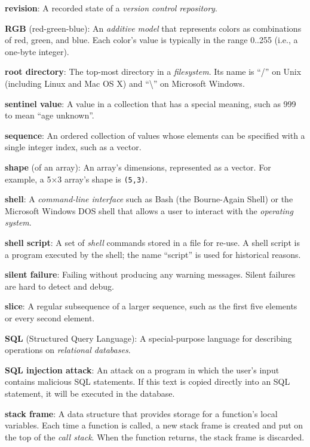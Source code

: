 \documentclass[]{book}
\newcommand{\gdef}[2]{\emph{#2}}
\begin{document}
\textbf{revision}: A recorded state of a
\gdef{g:version-control}{version control}
\gdef{g:repository}{repository}.

\textbf{RGB} (red-green-blue): An
\gdef{g:additive-color-model}{additive model} that represents colors
as combinations of red, green, and blue. Each color's value is typically
in the range 0..255 (i.e., a one-byte integer).

\textbf{root directory}: The top-most directory in a
\gdef{g:filesystem}{filesystem}. Its name is ``/'' on Unix
(including Linux and Mac OS X) and ``\textbackslash{}'' on Microsoft
Windows.

\textbf{sentinel value}: A value in a collection that has a special
meaning, such as 999 to mean ``age unknown''.

\textbf{sequence}: An ordered collection of values whose elements can be
specified with a single integer index, such as a vector.

\textbf{shape} (of an array): An array's dimensions, represented as a
vector. For example, a 5×3 array's shape is \texttt{(5,3)}.

\textbf{shell}: A \gdef{g:cli}{command-line interface} such as Bash
(the Bourne-Again Shell) or the Microsoft Windows DOS shell that allows
a user to interact with the \gdef{g:operating-system}{operating
system}.

\textbf{shell script}: A set of \gdef{g:shell}{shell} commands
stored in a file for re-use. A shell script is a program executed by the
shell; the name ``script'' is used for historical reasons.

\textbf{silent failure}: Failing without producing any warning messages.
Silent failures are hard to detect and debug.

\textbf{slice}: A regular subsequence of a larger sequence, such as the
first five elements or every second element.

\textbf{SQL} (Structured Query Language): A special-purpose language for
describing operations on \gdef{g:relational-database}{relational
databases}.

\textbf{SQL injection attack}: An attack on a program in which the
user's input contains malicious SQL statements. If this text is copied
directly into an SQL statement, it will be executed in the database.

\textbf{stack frame}: A data structure that provides storage for a
function's local variables. Each time a function is called, a new stack
frame is created and put on the top of the \gdef{g:call-stack}{call
stack}. When the function returns, the stack frame is discarded.
\end{document}

